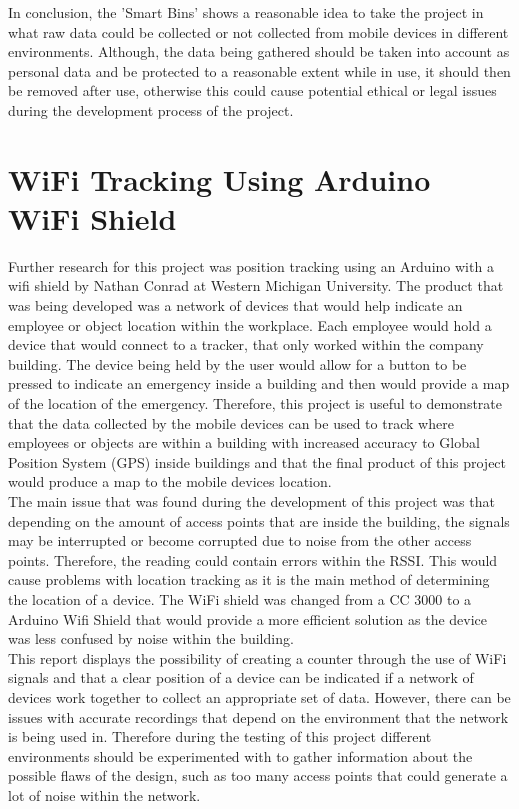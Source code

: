 \documentclass{report}
\begin{document}
In conclusion, the 'Smart Bins' shows a reasonable idea to take the project in what raw data could be collected or not collected from mobile devices in different environments. Although, the data being gathered should be taken into account as personal data and be protected to a reasonable extent while in use, it should then be removed after use, otherwise this could cause potential ethical or legal issues during the development process of the project. \\ \newline


\section{WiFi Tracking Using Arduino WiFi Shield}
Further research for this project was position tracking using an Arduino with a wifi shield by Nathan Conrad at Western Michigan University\cite{ProtrackingArduino}. The product that was being developed was a network of devices that would help indicate an employee or object location within the workplace.  Each employee would hold a device that would connect to a tracker, that only worked within the company building.  The device being held by the user would allow for a button to be pressed to indicate an emergency inside a building and then would provide a map of the location of the emergency. Therefore, this project is useful to demonstrate that the data collected by the mobile devices can be used to track where employees or objects are within a building with increased accuracy to Global Position System (GPS) inside buildings and that the final product of this project would produce a map to the mobile devices location. \\ \newline 
The main issue that was found during the development of this project was that depending on the amount of access points that are inside the building, the signals may be interrupted or become corrupted due to noise from the other access points. Therefore, the reading could contain errors within the RSSI. This would cause problems with location tracking as it is the main method of determining the location of a device.  The WiFi shield was changed from a CC 3000 to a Arduino Wifi Shield that would provide a more efficient solution as the device was less confused by noise within the building. \\ \newline
This report displays the possibility of creating a counter through the use of WiFi signals and that a clear position of a device can be indicated if a network of devices work together to collect an appropriate set of data. However, there can be issues with accurate recordings that depend on the environment that the network is being used in. Therefore during the testing of this project different environments should be experimented with to gather information about the possible flaws of the design, such as too many access points that could generate a lot of noise within the network.\\ \newline
\end{document}
